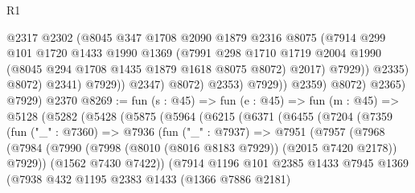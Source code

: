 \begin{lexlean}{R1}
\begin{coremodule}
                                @2317
                                @2302
                                (@8045
                                  @347
                                  @1708
                                  @2090
                                  @1879
                                  @2316
                                  @8075
                                  (@7914
                                    @299
                                    @101
                                    @1720
                                    @1433
                                    @1990
                                    @1369
                                    (@7991
                                      @298
                                      @1710
                                      @1719
                                      @2004
                                      @1990
                                      (@8045 @294 @1708 @1435 @1879 @1618 @8075 @8072)
                                      @2017)
                                    @7929))
                                @2335)
                              @8072)
                            @2341)
                          @7929))
                      @2347)
                    @8072)
                  @2353)
                @7929))
            @2359)
          @8072)
        @2365)
      @7929)
    @2370
@8269 := fun (s : @45) =>
  fun (e : @45) =>
  fun (m : @45) =>
  @5128
    (@5282
      (@5428
        (@5875
          (@5964
            (@6215
              (@6371
                (@6455
                  (@7204
                    (@7359
                      (fun ("_" : @7360) =>
                      @7936
                        (fun ("_" : @7937) =>
                        @7951
                          (@7957
                            (@7968
                              (@7984
                                (@7990
                                  (@7998 (@8010 (@8016 @8183 @7929)) (@2015 @7420 @2178))
                                  @7929))
                              (@1562 @7430 @7422))
                            (@7914
                              @1196
                              @101
                              @2385
                              @1433
                              @7945
                              @1369
                              (@7938
                                @432
                                @1195
                                @2383
                                @1433
                                (@1366 @7886 @2181)

\end{coremodule}
\end{lexlean}
